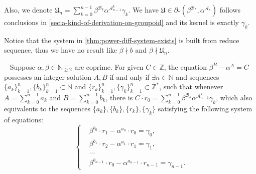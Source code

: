 Also, we denote $ \mathfrak{U}_{n} = \sum_{k=0}^{n-1}\beta^{\mathcal{B}_k}\alpha^{\mathcal{A}_{n-1}^{k}}\gamma_k$. We have $\mathfrak{U}\in\partial_{*}(\beta^{\mathcal{B}_{*}}, \alpha^{\mathcal{A}_{*}})$ follows conclusions in \cref{sec:a-kind-of-derivation-on-groupoid} and its kernel is exactly $\gamma_{k}$. 
\begin{remark}
	Notice that the system in \cref{thm:power-diff-system-exists} is built from reduce sequence, thus we have no result like $\beta \nmid b$ and $\beta\nmid \mathfrak{U}_n$.
\end{remark}
\begin{theorem}~\label{thm:power-diff-to-dynamical-system}
	Suppose $\alpha, \beta \in \mathbb{N}_{\ge2}$ are coprime. For given $C \in \mathbb{Z}$, the equation $\beta^{B} - \alpha^{A} = C$ possesses an integer solution $A, B$ if and only if $\exists n \in \mathbb{N}$ and sequences $\{a_k\}_{k=1}^{n}, \{b_k\}_{k=1}^{n} \subset \mathbb{N}$ and $\{r_k\}_{k=1}^{n}, \{\gamma_k\}_{k=1}^{n} \subset\mathbb{Z}^{*}$, such that whenever $A = \sum_{k=0}^{n-1}a_k$ and $B = \sum_{k=0}^{n-1}b_k$, there is $C \cdot r_0 = \sum_{k=0}^{n-1}\beta^{\mathcal{B}_k}\alpha^{\mathcal{A}_{n-1}^{k}}\gamma_k$, which also equivalents to the sequences $\{a_k\}, \{b_k\}, \{r_k\}, \{\gamma_k\}$ satisfying the following system of equations:
	\begin{equation}~\label{equ:equation-system-of-power-diff-to-dynamical-system}
		\left\{\begin{aligned}
		&\beta^{b_{0}}\cdot r_{1} - \alpha^{a_{0}} \cdot r_{0} = \gamma_{0},\\
		&\beta^{b_{1}}\cdot r_{2} - \alpha^{a_{1}} \cdot r_{1} = \gamma_{1},\\
		&\cdots \\
		&\beta^{b_{n-1}}\cdot r_{0} - \alpha^{a_{n-1}} \cdot r_{n-1} = \gamma_{n-1}.
	\end{aligned}\right.
	\end{equation}
\end{theorem}
